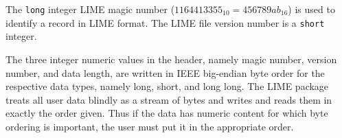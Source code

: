 \documentclass{article}
\begin{document}
The {\tt long} integer LIME magic number ($1164413355_{10} =
456789ab_{16}$) is used to identify a record in LIME format.  The LIME
file version number is a {\tt short} integer.

The three integer numeric values in the header, namely magic number,
version number, and data length, are written in IEEE big-endian byte
order for the respective data types, namely long, short, and long
long.  The LIME package treats all user data blindly as a stream of
bytes and writes and reads them in exactly the order given.  Thus if
the data has numeric content for which byte ordering is important, the
user must put it in the appropriate order.
\end{document}

